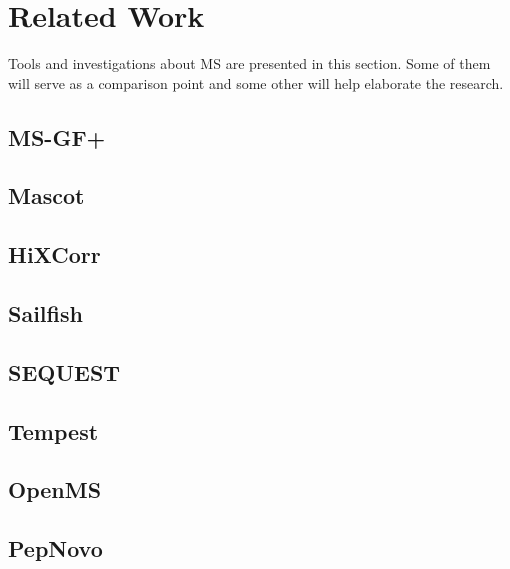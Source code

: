 \newpage
\section{Related Work}
\label{section:related-work}

Tools and investigations about \ac{MS} are presented in this section. Some of them will serve as a comparison point and some other will help elaborate the research.

\subsection{MS-GF+}


\subsection{Mascot}


\subsection{HiXCorr}


\subsection{Sailfish}
 
 
 \subsection{SEQUEST}
 

 \subsection{Tempest}
  

 \subsection{OpenMS}
 
 
 \subsection{PepNovo}
 
 
